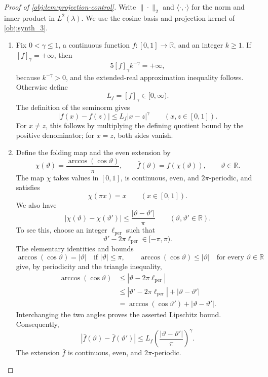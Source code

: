 \documentclass[11pt]{article}
\begin{document}
\begin{proof}[Proof of \cref{obj:lem:projection-control}]
Write \(\|\cdot\|_2\) and \(\langle\cdot,\cdot\rangle\) for the norm and inner product in \(L^2(\lambda)\). We use the cosine basis and projection kernel of \cref{obj:synth_3}.

\begin{enumerate}
\item Fix \(0<\gamma\le1\), a continuous function \(f:[0,1]\to\mathbb R\), and an integer \(k\ge1\). If \([f]_\gamma=+\infty\), then
\[
5[f]_\gamma k^{-\gamma}=+\infty,
\]
because \(k^{-\gamma}>0\), and the extended-real approximation inequality follows. Otherwise define
\[
L_f=[f]_\gamma\in[0,\infty).
\]
The definition of the seminorm gives
\[
|f(x)-f(z)|\le L_f|x-z|^\gamma
\qquad(x,z\in[0,1]).
\]
For \(x\ne z\), this follows by multiplying the defining quotient bound by the positive denominator; for \(x=z\), both sides vanish.

\item Define the folding map and the even extension by
\[
\chi(\vartheta)=\frac{\arccos(\cos\vartheta)}{\pi},
\qquad
\bar f(\vartheta)=f(\chi(\vartheta)),
\qquad \vartheta\in\mathbb R.
\]
The map \(\chi\) takes values in \([0,1]\), is continuous, even, and \(2\pi\)-periodic, and satisfies
\[
\chi(\pi x)=x\qquad(x\in[0,1]).
\]
We also have
\[
|\chi(\vartheta)-\chi(\vartheta')|
\le \frac{|\vartheta-\vartheta'|}{\pi}
\qquad(\vartheta,\vartheta'\in\mathbb R).
\]
To see this, choose an integer \(\ell_{\mathrm{per}}\) such that
\[
\vartheta'-2\pi\ell_{\mathrm{per}}\in[-\pi,\pi).
\]
The elementary identities and bounds
\[
\arccos(\cos\vartheta)=|\vartheta|
\quad\text{if }|\vartheta|\le\pi,
\qquad
\arccos(\cos\vartheta)\le|\vartheta|
\quad\text{for every }\vartheta\in\mathbb R
\]
give, by periodicity and the triangle inequality,
\[
\begin{aligned}
\arccos(\cos\vartheta)
&\le|\vartheta-2\pi\ell_{\mathrm{per}}|\\
&\le|\vartheta'-2\pi\ell_{\mathrm{per}}|
   +|\vartheta-\vartheta'|\\
&=\arccos(\cos\vartheta')+|\vartheta-\vartheta'|.
\end{aligned}
\]
Interchanging the two angles proves the asserted Lipschitz bound. Consequently,
\[
|\bar f(\vartheta)-\bar f(\vartheta')|
\le L_f\left(\frac{|\vartheta-\vartheta'|}{\pi}\right)^\gamma.
\]
The extension \(\bar f\) is continuous, even, and \(2\pi\)-periodic.


\end{enumerate}
\end{proof}
\end{document}
